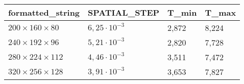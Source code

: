 \begin{tabular}{llll}
\toprule
formatted_string & SPATIAL_STEP & T_min & T_max \\
\midrule
$200 \times 160 \times 80$  & $6,25 \cdot  10^{-3}$ & 2,872 & 8,224 \\
$240 \times 192 \times 96$  & $5,21 \cdot  10^{-3}$ & 2,820 & 7,728 \\
$280 \times 224 \times 112$  & $4,46 \cdot  10^{-3}$ & 3,511 & 7,472 \\
$320 \times 256 \times 128$  & $3,91 \cdot  10^{-3}$ & 3,653 & 7,827 \\
\bottomrule
\end{tabular}
